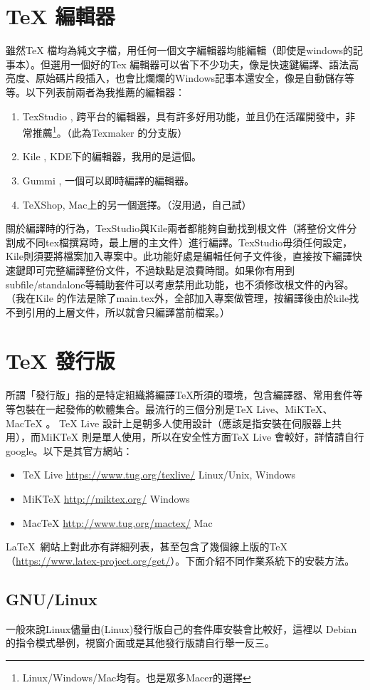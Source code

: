 \documentclass[class=NCU_thesis, crop=false, float=true]{standalone}
\begin{document}
\section{TeX 編輯器}
雖然TeX 檔均為純文字檔，用任何一個文字編輯器均能編輯（即使是windows的記事本）。但選用一個好的Tex 編輯器可以省下不少功夫，像是快速鍵編譯、語法高亮度、原始碼片段插入，也會比爛爛的Windows記事本還安全，像是自動儲存等等。以下列表前兩者為我推薦的編輯器：
\begin{enumerate}
    \item TexStudio , 跨平台的編輯器，具有許多好用功能，並且仍在活躍開發中，非常推薦\footnote{Linux/Windows/Mac均有。也是眾多Macer的選擇}。（此為Texmaker 的分支版）
    \item Kile , KDE下的編輯器，我用的是這個。
    \item Gummi , 一個可以即時編譯的編輯器。
    \item TeXShop, Mac上的另一個選擇。（沒用過，自己試） 
\end{enumerate}
關於編譯時的行為，TexStudio與Kile兩者都能夠自動找到根文件（將整份文件分割成不同tex檔撰寫時，最上層的主文件）進行編譯。TexStudio毋須任何設定，Kile則須要將檔案加入專案中。此功能好處是編輯任何子文件後，直接按下編譯快速鍵即可完整編譯整份文件，不過缺點是浪費時間。如果你有用到subfile/standalone等輔助套件可以考慮禁用此功能，也不須修改根文件的內容。（我在Kile 的作法是除了main.tex外，全部加入專案做管理，按編譯後由於kile找不到引用的上層文件，所以就會只編譯當前檔案。）

\section{TeX 發行版}
所謂「發行版」指的是特定組織將編譯TeX所須的環境，包含編譯器、常用套件等等包裝在一起發佈的軟體集合。最流行的三個分別是TeX Live、MiKTeX、MacTeX 。 TeX Live 設計上是朝多人使用設計（應該是指安裝在伺服器上共用），而MiKTeX 則是單人使用，所以在安全性方面TeX Live 會較好，詳情請自行google。以下是其官方網站：
\begin{itemize}
    \item TeX Live \url{https://www.tug.org/texlive/} Linux/Unix, Windows
    \item MiKTeX \url{http://miktex.org/} Windows
    \item MacTeX \url{http://www.tug.org/mactex/} Mac
\end{itemize}
\LaTeX\  網站上對此亦有詳細列表，甚至包含了幾個線上版的TeX（\url{https://www.latex-project.org/get/}）。下面介紹不同作業系統下的安裝方法。

\subsection{GNU/Linux}
一般來說Linux儘量由(Linux)發行版自己的套件庫安裝會比較好，這裡以 Debian 的指令模式舉例，視窗介面或是其他發行版請自行舉一反三。
\end{document}
